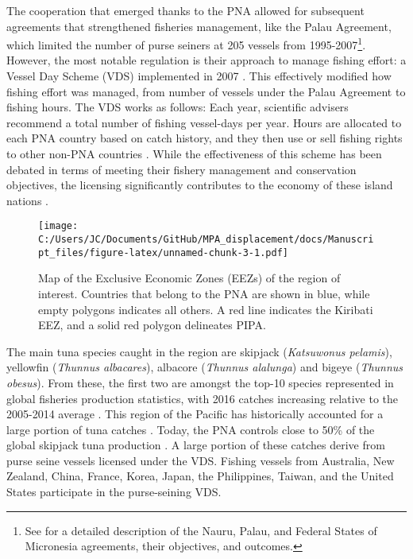 \documentclass[11pt,]{article}
\let\rmarkdownfootnote\footnote%
\def\footnote{\protect\rmarkdownfootnote}
\begin{document}
The cooperation that emerged thanks to the PNA allowed for subsequent
agreements that strengthened fisheries management, like the Palau
Agreement, which limited the number of purse seiners at 205 vessels from
1995-2007\footnote{See \citet{havice_2010} for a detailed description of
  the Nauru, Palau, and Federal States of Micronesia agreements, their
  objectives, and outcomes.}. However, the most notable regulation is
their approach to manage fishing effort: a Vessel Day Scheme (VDS)
implemented in 2007 \citep{havice_2013}. This effectively modified how
fishing effort was managed, from number of vessels under the Palau
Agreement to fishing hours. The VDS works as follows: Each year,
scientific advisers recommend a total number of fishing vessel-days per
year. Hours are allocated to each PNA country based on catch history,
and they then use or sell fishing rights to other non-PNA countries
\citep{aqorau_2018}. While the effectiveness of this scheme has been
debated in terms of meeting their fishery management and conservation
objectives, the licensing significantly contributes to the economy of
these island nations \citep{havice_2010}.

\begin{figure}
\centering
\texttt{[image: C:/Users/JC/Documents/GitHub/MPA\_displacement/docs/Manuscript\_files/figure-latex/unnamed-chunk-3-1.pdf]}
\caption{\label{fig:unnamed-chunk-3}\label{fig:PNA_map}Map of the Exclusive
Economic Zones (EEZs) of the region of interest. Countries that belong
to the PNA are shown in blue, while empty polygons indicates all others.
A red line indicates the Kiribati EEZ, and a solid red polygon
delineates PIPA.}
\end{figure}

The main tuna species caught in the region are skipjack
(\emph{Katsuwonus pelamis}), yellowfin (\emph{Thunnus albacares}),
albacore (\emph{Thunnus alalunga}) and bigeye (\emph{Thunnus obesus}).
From these, the first two are amongst the top-10 species represented in
global fisheries production statistics, with 2016 catches increasing
relative to the 2005-2014 average \citep{fao_2018}. This region of the
Pacific has historically accounted for a large portion of tuna catches
\citep{aqorau_1997}. Today, the PNA controls close to 50\% of the global
skipjack tuna production \citep{pna_website_2018}. A large portion of
these catches derive from purse seine vessels licensed under the VDS.
Fishing vessels from Australia, New Zealand, China, France, Korea,
Japan, the Philippines, Taiwan, and the United States participate in the
purse-seining VDS.
\end{document}
